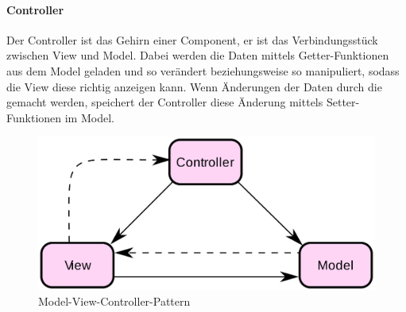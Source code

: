 \paragraph{Controller}
Der Controller ist das Gehirn einer Component, er ist das Verbindungsstück zwischen View und Model.
Dabei werden die Daten mittels Getter-Funktionen aus dem Model geladen und so verändert beziehungsweise so manipuliert, sodass die View diese richtig
anzeigen kann.
Wenn Änderungen der Daten durch die gemacht werden, speichert der Controller diese Änderung mittels Setter-Funktionen im Model.

\begin{figure}[hbt!]
    \centering
    \includegraphics[scale=0.1]{pics/mvc_design_pattern}
    \caption{Model-View-Controller-Pattern}
    \label{fig:mvc_design_pattern}
\end{figure}